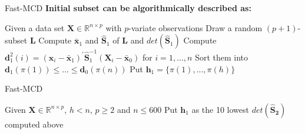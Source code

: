 \documentclass[newPxFont, numfooter, sectionpages]{beamer}
\begin{document}
\begin{frame}[c]{Fast-MCD}
	\textbf{Initial subset can be algorithmically described as:}
	\begin{algorithm}[H]\label{alg:alg02}
		\scriptsize
		\SetAlgoLined
		Given a data set $\boldsymbol{X} \in \mathbb{R}^{n \times p}$ with $p$-variate observations\;
		Draw a random $(p + 1)$-subset $\boldsymbol{L}$\;
		Compute $\boldsymbol{\bar{x}}_1$ and $\boldsymbol{\hat{S}}_1$ of $\boldsymbol{L}$ and $det(\boldsymbol{\hat{S}}_1)$\;
		Compute $\boldsymbol{d}_1^2(i) = (\boldsymbol{x}_i - \boldsymbol{\bar{x}}_1)^\prime \boldsymbol{\hat{S}}_1^{-1}(\boldsymbol{X}_i - \boldsymbol{\bar{x}}_0)$ for $i = 1, ..., n$\;
		Sort them into $\boldsymbol{d}_1(\pi(1)) \leq ... \leq \boldsymbol{d}_0(\pi(n))$\;
		Put $\boldsymbol{h}_1 = \{\pi(1), ..., \pi(h)\}$\;
		\caption{Constructing the initial subset}
	\end{algorithm}
\end{frame}

\begin{frame}[c]{Fast-MCD}
	\begin{algorithm}[H]\label{alg:alg03}
		\scriptsize
		\SetAlgoLined
		Given $\boldsymbol{X} \in \mathbb{R}^{n \times p}$, $h < n$, $p \geq 2$ and $n \leq 600$\;
		Put $\boldsymbol{h}_1$ as the 10 lowest $det(\boldsymbol{\hat{S}_2})$ computed above\;
		\caption{Fast-MCD when $n \leq 600$}
	\end{algorithm}
\end{frame}
\end{document}
